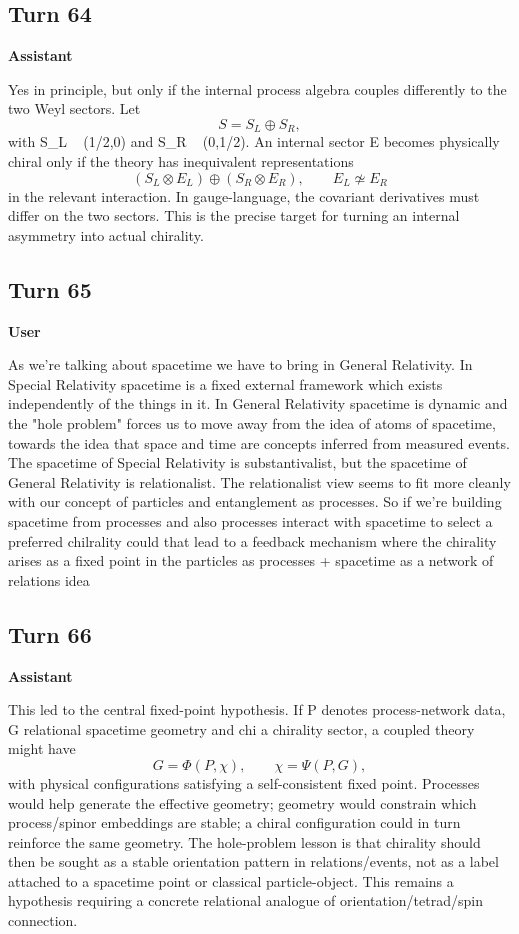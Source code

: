 \documentclass[11pt,a4paper]{article}
\newcommand{\speaker}[1]{\par\medskip\noindent\textbf{\large #1}\par\smallskip}
\begin{document}
\subsection*{Turn 64}
\speaker{Assistant}
Yes in principle, but only if the internal process algebra couples differently to the two Weyl sectors. Let
\[
S=S_L\oplus S_R,
\]
with S_L ~ (1/2,0) and S_R ~ (0,1/2). An internal sector E becomes physically chiral only if the theory has inequivalent representations
\[
(S_L\otimes E_L)\oplus(S_R\otimes E_R),\qquad E_L\not\simeq E_R
\]
in the relevant interaction. In gauge-language, the covariant derivatives must differ on the two sectors. This is the precise target for turning an internal asymmetry into actual chirality.
\subsection*{Turn 65}
\speaker{User}
As we're talking about spacetime we have to bring in General Relativity. In Special Relativity spacetime is a fixed external framework which exists independently of the things in it. In General Relativity spacetime is dynamic and the "hole problem" forces us to move away from the idea of atoms of spacetime, towards the idea that space and time are concepts inferred from measured events. The spacetime of Special Relativity is substantivalist, but the spacetime of General Relativity is relationalist. The relationalist view seems to fit more cleanly with our concept of particles and entanglement as processes. So if we're building spacetime from processes and also processes interact with spacetime to select a preferred chilrality could that lead to a feedback mechanism where the chirality arises as a fixed point in the particles as processes + spacetime as a network of relations idea
\subsection*{Turn 66}
\speaker{Assistant}
This led to the central fixed-point hypothesis. If P denotes process-network data, G relational spacetime geometry and chi a chirality sector, a coupled theory might have
\[
G=\Phi(P,\chi),\qquad \chi=\Psi(P,G),
\]
with physical configurations satisfying a self-consistent fixed point. Processes would help generate the effective geometry; geometry would constrain which process/spinor embeddings are stable; a chiral configuration could in turn reinforce the same geometry. The hole-problem lesson is that chirality should then be sought as a stable orientation pattern in relations/events, not as a label attached to a spacetime point or classical particle-object. This remains a hypothesis requiring a concrete relational analogue of orientation/tetrad/spin connection.
\end{document}

